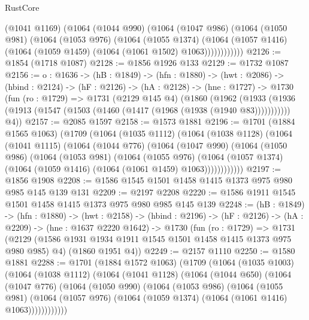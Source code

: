 \begin{lexlean}{RustCore}
\begin{coremodule}
            (@1041 @1169)
            (@1064
              (@1044 @990)
              (@1064
                (@1047 @986)
                (@1064
                  (@1050 @981)
                  (@1064
                    (@1053 @976)
                    (@1064
                      (@1055 @1374)
                      (@1064
                        (@1057 @1416)
                        (@1064 (@1059 @1459) (@1064 (@1061 @1502) @1063))))))))))))
@2126 := @1854 (@1718 @1087)
@2128 := @1856 @1926 @133
@2129 := @1732 @1087
@2156 := {o : @1636} ->
  (hB : @1849) ->
  (hfn : @1880) ->
  (hwt : @2086) ->
  (hbind : @2124) ->
  (hF : @2126) ->
  (hA : @2128) ->
  (hne : @1727) ->
  @1730
    (fun (ro : @1729) =>
    @1731
      (@2129 @145 @4)
      (@1860
        (@1962 (@1933 (@1936 (@1913 (@1547 (@1503 (@1460 (@1417 (@1968 (@1938 (@1940 @83)))))))))))
        @4))
@2157 := @2085 @1597
@2158 := @1573 @1881
@2196 := @1701
    (@1884 @1565 @1063)
    (@1709
      (@1064
        (@1035 @1112)
        (@1064
          (@1038 @1128)
          (@1064
            (@1041 @1115)
            (@1064
              (@1044 @776)
              (@1064
                (@1047 @990)
                (@1064
                  (@1050 @986)
                  (@1064
                    (@1053 @981)
                    (@1064
                      (@1055 @976)
                      (@1064
                        (@1057 @1374)
                        (@1064 (@1059 @1416) (@1064 (@1061 @1459) @1063))))))))))))
@2197 := @1856 @1908
@2208 := @1586 @1545 @1501 @1458 @1415 @1373 @975 @980 @985 @145 @139 @131
@2209 := @2197 @2208
@2220 := @1586 @1911 @1545 @1501 @1458 @1415 @1373 @975 @980 @985 @145 @139
@2248 := (hB : @1849) ->
  (hfn : @1880) ->
  (hwt : @2158) ->
  (hbind : @2196) ->
  (hF : @2126) ->
  (hA : @2209) ->
  (hne : @1637 @2220 @1642) ->
  @1730
    (fun (ro : @1729) =>
    @1731
      (@2129 (@1586 @1931 @1934 @1911 @1545 @1501 @1458 @1415 @1373 @975 @980 @985) @4)
      (@1860 @1951 @4))
@2249 := @2157 @1110
@2250 := @1580 @1881
@2288 := @1701
    (@1884 @1572 @1063)
    (@1709
      (@1064
        (@1035 @1003)
        (@1064
          (@1038 @1112)
          (@1064
            (@1041 @1128)
            (@1064
              (@1044 @650)
              (@1064
                (@1047 @776)
                (@1064
                  (@1050 @990)
                  (@1064
                    (@1053 @986)
                    (@1064
                      (@1055 @981)
                      (@1064
                        (@1057 @976)
                        (@1064 (@1059 @1374) (@1064 (@1061 @1416) @1063))))))))))))

\end{coremodule}
\end{lexlean}
